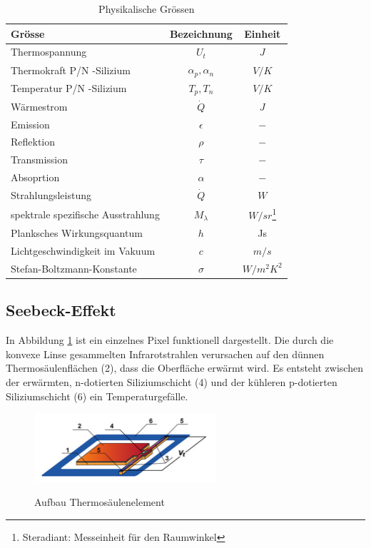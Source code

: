 \begin{table}[H]
	\centering
	\begin{tabular}{l|c|c}
		\rowcolor{gray} Grösse &  Bezeichnung  & Einheit \\
		\hline 
		Thermospannung &  $ U_{t}$ & $J$  \\ 
		\rowcolor{gray} Thermokraft P/N -Silizium  & $\alpha_{p},\alpha_{n}$ & $V/K$\\	
		Temperatur P/N -Silizium &  $T_{p},T_{n}$ & $V/K$ \\
		\rowcolor{gray}Wärmestrom &  $\dot{Q}$ & $J$  \\ 
		Emission & $\epsilon$ & $-$\\	
		\rowcolor{gray}Reflektion &  $\rho $ & $-$ \\
		Transmission & $\tau$ & $-$\\
		\rowcolor{gray}Absoprtion &  $\alpha$ & $-$  \\ 
		Strahlungsleistung & $\dot{Q}$ & $W$\\
		\rowcolor{gray}spektrale spezifische Ausstrahlung &  $M_{\lambda }$ & $W/sr$\footnote[2]{Steradiant: Messeinheit für den Raumwinkel} \\
		Planksches Wirkungsquantum &  $ h$ & Js \\ 
		\rowcolor{gray} Lichtgeschwindigkeit im Vakuum & $c $ & $ m/s$ \\ 
 		Stefan-Boltzmann-Konstante & $\sigma$ & $ W/m^2K^2 $ \\ 
	\end{tabular}
	\caption{Physikalische Grössen}
	\label{tab:Legende Physikalische Grössen} 
\end{table} 


\subsection{Seebeck-Effekt}
\label{subsec:seebeck}
In Abbildung \ref{fig:AufbauThermo} ist ein einzelnes Pixel funktionell dargestellt. Die durch die konvexe Linse gesammelten Infrarotstrahlen verursachen auf den dünnen Thermosäulenflächen (2), dass die Oberfläche erwärmt wird. Es entsteht zwischen der erwärmten, n-dotierten Siliziumschicht (4) und der kühleren p-dotierten Siliziumschicht (6) ein Temperaturgefälle.   

\begin{figure}[H]
	\centering
	\includegraphics[width=0.6\textwidth]
	{fig/Mems_Thermopile.PNG}
	\caption[Aufbau Thermosäulenelement]{Aufbau Thermosäulenelement} \protect\cite{AMG8834}
	\label{fig:AufbauThermo}
\end{figure}

